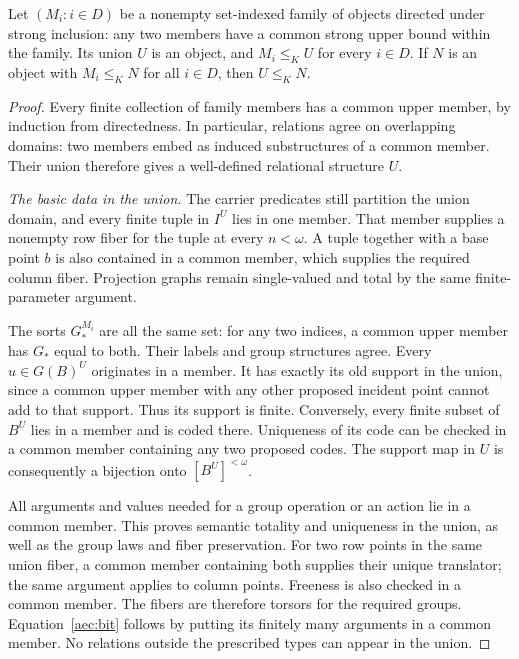 \begin{lemma}\label{aec:directed}
Let \((M_i:i\in D)\) be a nonempty set-indexed family of
objects directed under strong inclusion: any two members
have a common strong upper bound within the family.
Its union \(U\) is an object, and \(M_i\le_K U\) for every
\(i\in D\).  If \(N\) is an object with \(M_i\le_K N\)
for all \(i\in D\), then \(U\le_K N\).
\end{lemma}

\begin{proof}
Every finite collection of family members has a common upper
member, by induction from directedness.  In particular,
relations agree on overlapping domains: two members embed
as induced substructures of a common member.  Their union
therefore gives a well-defined relational structure \(U\).

\emph{The basic data in the union.}
The carrier predicates still partition the union domain,
and every finite tuple in \(I^U\) lies in one member.
That member supplies a nonempty row fiber for the tuple at
every \(n<\omega\).  A tuple together with a base point
\(b\) is also contained in a common member, which supplies
the required column fiber.  Projection graphs remain
single-valued and total by the same finite-parameter
argument.

The sorts \(G_*^{M_i}\) are all the same set: for any
two indices, a common upper member has \(G_*\) equal
to both.  Their labels and group structures agree.
Every \(u\in G(B)^U\) originates in a member.  It has
exactly its old support in the union, since a common upper
member with any other proposed incident point cannot add
to that support.  Thus its support is finite.
Conversely, every finite subset of \(B^U\) lies in a
member and is coded there.  Uniqueness of its code can
be checked in a common member containing any two proposed
codes.  The support map in \(U\) is consequently a
bijection onto \([B^U]^{<\omega}\).

All arguments and values needed for a group operation or
an action lie in a common member.  This proves semantic
totality and uniqueness in the union, as well as the
group laws and fiber preservation.  For two row points
in the same union fiber, a common member containing
both supplies their unique translator; the same argument
applies to column points.  Freeness is also checked in
a common member.  The fibers are therefore torsors for
the required groups.  Equation~\eqref{aec:bit} follows
by putting its finitely many arguments in a common
member.  No relations outside the prescribed types
can appear in the union.


\end{proof}
